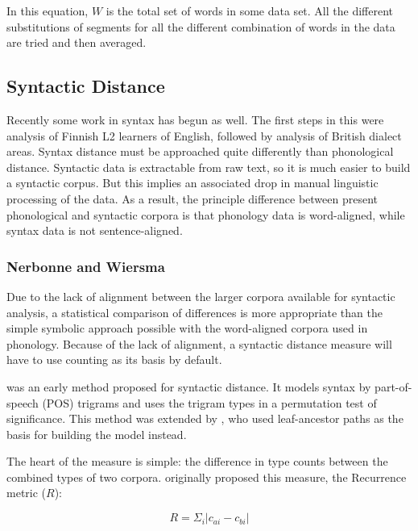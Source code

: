 \documentclass[11pt]{article}
\begin{document}
In this equation, $W$ is the total set of words in some data set. All
the different substitutions of segments for all the different
combination of words in the data are tried and then averaged.

\subsection{Syntactic  Distance}
Recently some work in syntax has begun as well. The first steps in
this were  analysis of Finnish L2 learners
of English, followed by  analysis of British dialect
areas. Syntax distance must be approached quite differently than
phonological distance. Syntactic data is extractable from raw
text, so it is much easier to build a syntactic corpus. But this implies an
associated drop in manual linguistic processing of the
data. As a result, the principle difference between present phonological and
syntactic corpora is that phonology data is word-aligned, while syntax
data is not sentence-aligned.

\subsubsection{Nerbonne and Wiersma}
\label{nerbonne06}

Due to the lack of alignment between the
larger corpora available for syntactic analysis, a statistical
comparison of differences is more appropriate than the simple
symbolic approach possible with the word-aligned corpora used in
phonology. Because of the lack of alignment, a syntactic distance
measure will have to use counting as its basis by default.

 was an early method proposed for syntactic
distance.  It models syntax by part-of-speech (POS) trigrams and uses
the trigram types in a permutation test of significance. This method was
extended by , who used 
leaf-ancestor paths as the basis for building the model instead.

The heart of the measure is simple: the difference in type counts
between the combined types of two corpora. 
originally proposed this measure, the {\sc Recurrence}
metric ($R$):

\begin{equation}
R = \Sigma_i |c_{ai} - c_{bi}|
\label{rmeasure}
\end{equation}
\end{document}
